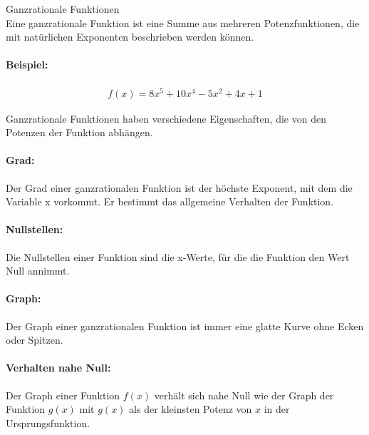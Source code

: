 \documentclass[12pt,a4paper]{report}
\newenvironment{gblock}[1]{
    \tcolorbox[beamer,
        noparskip,
        colback=green!50!,
        colbacklower=green!75!green,
        title=#1]}
{\endtcolorbox}
\begin{document}
	\noindent
	\Large
	Ganzrationale Funktionen
	\large
	\\
	\begin{gblock}{Übersicht}
		Eine ganzrationale Funktion ist eine Summe aus mehreren Potenzfunktionen, die mit natürlichen Exponenten beschrieben werden können.
		\paragraph{Beispiel:} \mbox{}
		\begin{align*}
			f(x) = 8x^5 + 10x^4 - 5x^2 + 4x + 1
		\end{align*}
		\begin{center}
		\end{center}
	\end{gblock}
	
	\begin{gblock}{Eigenschaften}
	Ganzrationale Funktionen haben verschiedene Eigenschaften, die von den Potenzen der Funktion abhängen.
	\paragraph{Grad:} Der Grad einer ganzrationalen Funktion ist der höchste Exponent, mit dem die Variable x vorkommt. Er bestimmt das allgemeine Verhalten der Funktion.
	\paragraph{Nullstellen:} Die Nullstellen einer Funktion sind die x-Werte, für die die Funktion den Wert Null annimmt.
	\paragraph{Graph:} Der Graph einer ganzrationalen Funktion ist immer eine glatte Kurve ohne Ecken oder Spitzen.
	\paragraph{Verhalten nahe Null:} Der Graph einer Funktion $f(x)$ verhält sich nahe Null wie der Graph der Funktion $g(x)$ mit $g(x)$ als der kleinsten Potenz von $x$ in der Ursprungsfunktion.
\end{gblock}
\end{document}
